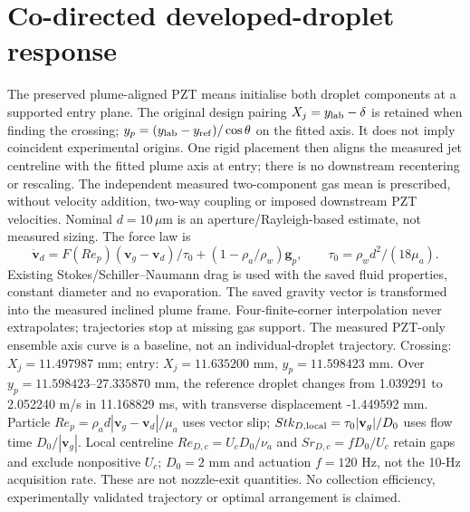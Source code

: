 \section{Co-directed developed-droplet response}
The preserved plume-aligned PZT means initialise both droplet components at a supported entry plane.
The original design pairing $X_j=y_{\rm lab}-\delta$ is retained when finding the crossing;
$y_p=(y_{\rm lab}-y_{\rm ref})/\cos\theta$ on the fitted axis. It does not imply coincident experimental origins.
One rigid placement then aligns the measured jet centreline with the fitted plume axis at entry;
there is no downstream recentering or rescaling. The independent measured two-component gas mean
is prescribed, without velocity addition, two-way coupling or imposed downstream PZT velocities.
Nominal $d=10\,\mu$m is an aperture/Rayleigh-based estimate, not measured sizing.
The force law is
\[\dot{\mathbf v}_d=F(Re_p)(\mathbf v_g-\mathbf v_d)/\tau_0+(1-\rho_a/\rho_w)\mathbf g_p,\qquad
\tau_0=\rho_w d^2/(18\mu_a).\]
Existing Stokes/Schiller--Naumann drag is used with the saved fluid properties, constant diameter
and no evaporation. The saved gravity vector is transformed into the measured inclined plume frame.
Four-finite-corner interpolation never extrapolates; trajectories stop at missing gas support.
The measured PZT-only ensemble axis curve is a baseline, not an individual-droplet trajectory.
Crossing: $X_j=11.497987$ mm; entry: $X_j=11.635200$ mm, $y_p=11.598423$ mm. Over $y_p=11.598423$--$27.335870$ mm, the reference droplet changes from 1.039291 to 2.052240 m/s in 11.168829 ms, with transverse displacement -1.449592 mm. Particle $Re_p=\rho_a d|\mathbf v_g-\mathbf v_d|/\mu_a$ uses vector slip;
$Stk_{D,\rm local}=\tau_0|\mathbf v_g|/D_0$ uses flow time $D_0/|\mathbf v_g|$.
Local centreline $Re_{D,c}=U_cD_0/\nu_a$ and $Sr_{D,c}=fD_0/U_c$ retain gaps and exclude nonpositive $U_c$;
$D_0=2$ mm and actuation $f=120$ Hz, not the 10-Hz acquisition rate. These are not nozzle-exit quantities.
No collection efficiency, experimentally validated trajectory or optimal arrangement is claimed.
